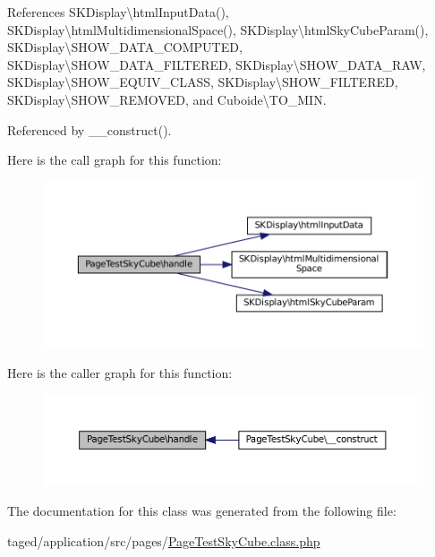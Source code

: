 References S\+K\+Display\textbackslash{}html\+Input\+Data(), S\+K\+Display\textbackslash{}html\+Multidimensional\+Space(), S\+K\+Display\textbackslash{}html\+Sky\+Cube\+Param(), S\+K\+Display\textbackslash{}\+S\+H\+O\+W\+\_\+\+D\+A\+T\+A\+\_\+\+C\+O\+M\+P\+U\+T\+ED, S\+K\+Display\textbackslash{}\+S\+H\+O\+W\+\_\+\+D\+A\+T\+A\+\_\+\+F\+I\+L\+T\+E\+R\+ED, S\+K\+Display\textbackslash{}\+S\+H\+O\+W\+\_\+\+D\+A\+T\+A\+\_\+\+R\+AW, S\+K\+Display\textbackslash{}\+S\+H\+O\+W\+\_\+\+E\+Q\+U\+I\+V\+\_\+\+C\+L\+A\+SS, S\+K\+Display\textbackslash{}\+S\+H\+O\+W\+\_\+\+F\+I\+L\+T\+E\+R\+ED, S\+K\+Display\textbackslash{}\+S\+H\+O\+W\+\_\+\+R\+E\+M\+O\+V\+ED, and Cuboide\textbackslash{}\+T\+O\+\_\+\+M\+IN.



Referenced by \+\_\+\+\_\+construct().

Here is the call graph for this function\+:\nopagebreak
\begin{figure}[H]
\begin{center}
\leavevmode
\includegraphics[width=350pt]{class_page_test_sky_cube_ae6489f90f41cdf80edb1b0b435e1c262_cgraph}
\end{center}
\end{figure}
Here is the caller graph for this function\+:\nopagebreak
\begin{figure}[H]
\begin{center}
\leavevmode
\includegraphics[width=350pt]{class_page_test_sky_cube_ae6489f90f41cdf80edb1b0b435e1c262_icgraph}
\end{center}
\end{figure}


The documentation for this class was generated from the following file\+:\begin{DoxyCompactItemize}
\item 
taged/application/src/pages/\hyperlink{_page_test_sky_cube_8class_8php}{Page\+Test\+Sky\+Cube.\+class.\+php}\end{DoxyCompactItemize}

